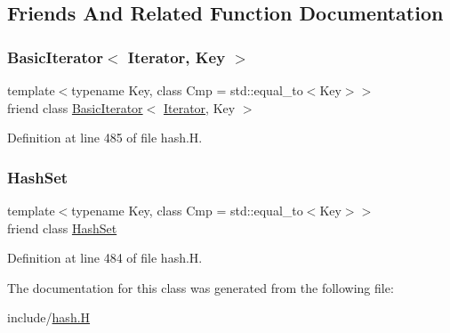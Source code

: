 \subsection{Friends And Related Function Documentation}
\mbox{\label{class_designar_1_1_hash_set_1_1_iterator_a0b375a570add16b09037ce1773f0ddbb}} 
\subsubsection{\texorpdfstring{Basic\+Iterator$<$ Iterator, Key $>$}{BasicIterator< Iterator, Key >}}
{\footnotesize\ttfamily template$<$typename Key, class Cmp = std\+::equal\+\_\+to$<$\+Key$>$$>$ \\
friend class \hyperlink{class_designar_1_1_basic_iterator}{Basic\+Iterator}$<$ \hyperlink{class_designar_1_1_hash_set_1_1_iterator}{Iterator}, Key $>$\hspace{0.3cm}{\ttfamily [friend]}}



Definition at line 485 of file hash.\+H.

\mbox{\label{class_designar_1_1_hash_set_1_1_iterator_ac5220f06200dc3b0d55d050a940f17b9}} 
\subsubsection{\texorpdfstring{Hash\+Set}{HashSet}}
{\footnotesize\ttfamily template$<$typename Key, class Cmp = std\+::equal\+\_\+to$<$\+Key$>$$>$ \\
friend class \hyperlink{class_designar_1_1_hash_set}{Hash\+Set}\hspace{0.3cm}{\ttfamily [friend]}}



Definition at line 484 of file hash.\+H.



The documentation for this class was generated from the following file\+:\begin{DoxyCompactItemize}
\item 
include/\hyperlink{hash_8_h}{hash.\+H}\end{DoxyCompactItemize}

